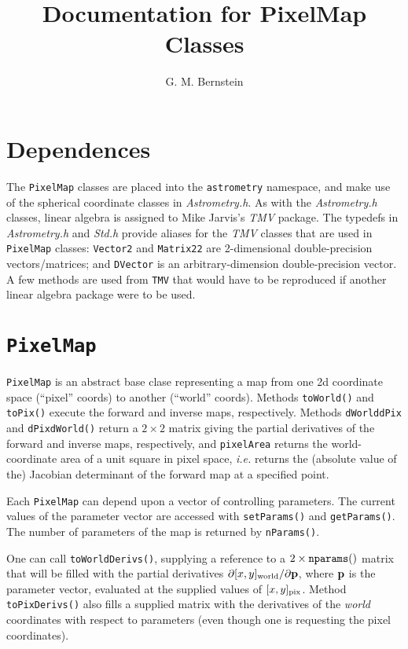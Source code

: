 \documentclass[11pt,preprint,flushrt]{aastex}
\begin{document}

\title{Documentation for PixelMap Classes}

\author{G. M. Bernstein}

\section{Dependences}
The {\tt PixelMap} classes are placed into the {\tt astrometry} namespace, and make use of the spherical coordinate classes in {\it Astrometry.h}.  As with the {\it Astrometry.h} classes, linear algebra is assigned to Mike Jarvis's {\it TMV} package.  The typedefs in {\it Astrometry.h} and {\it Std.h} provide aliases for the {\it TMV} classes that are used in {\tt PixelMap} classes:  {\tt Vector2} and {\tt Matrix22} are 2-dimensional double-precision vectors/matrices; and {\tt DVector} is an arbitrary-dimension double-precision vector.  A few methods are used from {\tt TMV} that would have to be reproduced if another linear algebra package were to be used.

\section{{\tt PixelMap}}
{\tt PixelMap} is an abstract base clase representing a map from one
2d coordinate space (``pixel'' coords) to another (``world'' coords).
Methods {\tt toWorld()} and {\tt toPix()} execute the forward and inverse maps, respectively.  Methods {\tt  dWorlddPix}  and {\tt dPixdWorld()} return a $2\times2$ matrix giving the partial derivatives of the forward and inverse maps, respectively, and {\tt pixelArea} returns the world-coordinate area of a unit square in pixel space, {\it i.e.} returns the (absolute value of the) Jacobian determinant of the forward map at a specified point.

Each {\tt PixelMap} can depend upon a vector of controlling parameters.  The current values of the parameter vector are accessed with {\tt setParams()} and {\tt getParams()}.  The number of parameters of the map is returned by {\tt nParams()}. 

One can call {\tt toWorldDerivs()}, supplying a reference to a $2\times{\tt nparams()}$ matrix that will be filled with the partial derivatives $\partial[x,y]_{\rm world} / \partial {\bf p}$, where ${\bf p}$ is the parameter vector, evaluated at the supplied values of $[x,y]_{\rm pix}$.  Method {\tt toPixDerivs()} also fills a supplied matrix with the derivatives of the {\em world} coordinates with respect to parameters (even though one is requesting the pixel coordinates).
\end{document}
